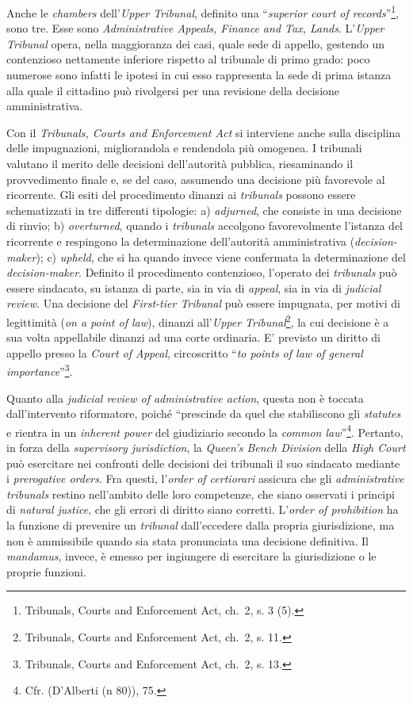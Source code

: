 \documentclass[12pt,it,a4paper,]{report}
\begin{document}
Anche le \emph{chambers} dell'\emph{Upper Tribunal}, definito una
``\emph{superior court of records}''\footnote{Tribunals, Courts and
  Enforcement Act, ch.~2, s. 3 (5).}, sono tre. Esse sono
\emph{Administrative Appeals, Finance and Tax, Lands}. L'\emph{Upper
Tribunal} opera, nella maggioranza dei casi, quale sede di appello,
gestendo un contenzioso nettamente inferiore rispetto al tribunale di
primo grado: poco numerose sono infatti le ipotesi in cui esso
rappresenta la sede di prima istanza alla quale il cittadino può
rivolgersi per una revisione della decisione amministrativa.

Con il \emph{Tribunals, Courts and Enforcement Act} si interviene anche
sulla disciplina delle impugnazioni, migliorandola e rendendola più
omogenea. I tribunali valutano il merito delle decisioni dell'autorità
pubblica, riesaminando il provvedimento finale e, se del caso, assumendo
una decisione più favorevole al ricorrente. Gli esiti del procedimento
dinanzi ai \emph{tribunals} possono essere schematizzati in tre
differenti tipologie: a) \emph{adjurned}, che consiste in una decisione
di rinvio; b) \emph{overturned}, quando i \emph{tribunals} accolgono
favorevolmente l'istanza del ricorrente e respingono la determinazione
dell'autorità amministrativa (\emph{decision-maker}); c) \emph{upheld},
che si ha quando invece viene confermata la determinazione del
\emph{decision-maker}. Definito il procedimento contenzioso, l'operato
dei \emph{tribunals} può essere sindacato, su istanza di parte, sia in
via di \emph{appeal}, sia in via di \emph{judicial review}. Una
decisione del \emph{First-tier Tribunal} può essere impugnata, per
motivi di legittimità (\emph{on a point of law}), dinanzi
all'\emph{Upper Tribunal}\footnote{Tribunals, Courts and Enforcement
  Act, ch.~2, s. 11.}, la cui decisione è a sua volta appellabile
dinanzi ad una corte ordinaria. E' previsto un diritto di appello presso
la \emph{Court of Appeal}, circoscritto ``\emph{to points of law of
general importance}''\footnote{Tribunals, Courts and Enforcement Act,
  ch.~2, s. 13.}.

Quanto alla \emph{judicial review of administrative action}, questa non
è toccata dall'intervento riformatore, poiché ``prescinde da quel che
stabiliscono gli \emph{statutes} e rientra in un \emph{inherent power}
del giudiziario secondo la \emph{common law}''\footnote{Cfr. (D'Alberti
  (n 80)), 75.}. Pertanto, in forza della \emph{supervisory
jurisdiction}, la \emph{Queen's Bench Division} della \emph{High Court}
può esercitare nei confronti delle decisioni dei tribunali il suo
sindacato mediante i \emph{prerogative orders}. Fra questi,
l'\emph{order of certiorari} assicura che gli \emph{administrative
tribunals} restino nell'ambito delle loro competenze, che siano
osservati i principi di \emph{natural justice}, che gli errori di
diritto siano corretti. L'\emph{order of prohibition} ha la funzione di
prevenire un \emph{tribunal} dall'eccedere dalla propria giurisdizione,
ma non è ammissibile quando sia stata pronunciata una decisione
definitiva. Il \emph{mandamus}, invece, è emesso per ingiungere di
esercitare la giurisdizione o le proprie funzioni.
\end{document}
